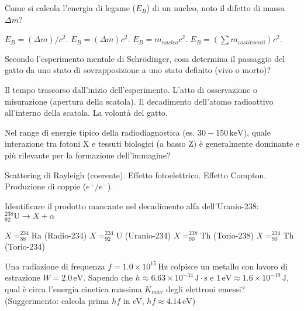 \documentclass{exam}%
\begin{document}
\begin{questions}%
\question Come si calcola l'energia di legame ($E_B$) di un nucleo, noto il difetto di massa $\Delta m$?%
\vspace{0.2em}%
\begin{multicols}{4}%
\begin{choices}%
\choice $E_B = (\Delta m) / c^2$.%
\choice $E_B = (\Delta m) c^2$.%
\choice $E_B = m_{nucleo} c^2$.%
\choice $E_B = (\sum m_{costituenti}) c^2$.%
\end{choices}%
\end{multicols}%
\question Secondo l'esperimento mentale di Schrödinger, cosa determina il passaggio del gatto da uno stato di sovrapposizione a uno stato definito (vivo o morto)?%
\vspace{0.2em}%
\begin{choices}%
\choice Il tempo trascorso dall'inizio dell'esperimento.%
\choice L'atto di osservazione o misurazione (apertura della scatola).%
\choice Il decadimento dell'atomo radioattivo all'interno della scatola.%
\choice La volontà del gatto.%
\end{choices}%
\question Nel range di energie tipico della radiodiagnostica (es. $30-150 \, \text{keV}$), quale interazione tra fotoni X e tessuti biologici (a basso Z) è generalmente dominante e più rilevante per la formazione dell'immagine?%
\vspace{0.2em}%
\begin{multicols}{2}%
\begin{choices}%
\choice Scattering di Rayleigh (coerente).%
\choice Effetto fotoelettrico.%
\choice Effetto Compton.%
\choice Produzione di coppie ($e^+/e^-$).%
\end{choices}%
\end{multicols}%
\question Identificare il prodotto mancante nel decadimento alfa dell'Uranio-238: $^{238}_{92}\text{U} \rightarrow X + \alpha$%
\vspace{0.2em}%
\begin{multicols}{4}%
\begin{choices}%
\choice $X = ^{234}_{88}\text{Ra}$ (Radio-234)%
\choice $X = ^{234}_{92}\text{U}$ (Uranio-234)%
\choice $X = ^{238}_{90}\text{Th}$ (Torio-238)%
\choice $X = ^{234}_{90}\text{Th}$ (Torio-234)%
\end{choices}%
\end{multicols}%
\question Una radiazione di frequenza $f = 1.0 \times 10^{15} \, \text{Hz}$ colpisce un metallo con lavoro di estrazione $W = 2.0 \, \text{eV}$. Sapendo che $h \approx 6.63 \times 10^{-34} \, \text{J} \cdot \text{s}$ e $1 \, \text{eV} \approx 1.6 \times 10^{-19} \, \text{J}$, qual è circa l'energia cinetica massima $K_{max}$ degli elettroni emessi? (Suggerimento: calcola prima $hf$ in eV, $hf \approx 4.14 \, \text{eV}$)%

\end{questions}
\end{document}
